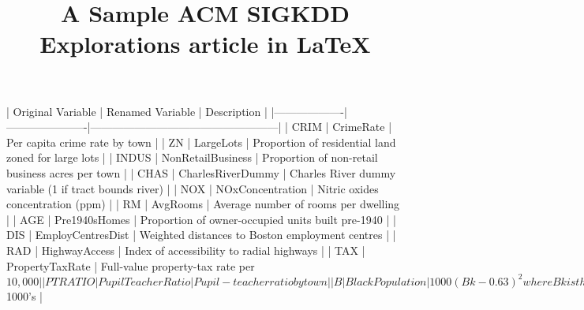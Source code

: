\documentclass{sigkddExp}
\begin{document}
| Original Variable | Renamed Variable     | Description                                       |
|-------------------|----------------------|---------------------------------------------------|
| CRIM              | CrimeRate            | Per capita crime rate by town                     |
| ZN                | LargeLots            | Proportion of residential land zoned for large lots |
| INDUS             | NonRetailBusiness    | Proportion of non-retail business acres per town  |
| CHAS              | CharlesRiverDummy    | Charles River dummy variable (1 if tract bounds river) |
| NOX               | NOxConcentration     | Nitric oxides concentration (ppm)                 |
| RM                | AvgRooms             | Average number of rooms per dwelling              |
| AGE               | Pre1940sHomes        | Proportion of owner-occupied units built pre-1940 |
| DIS               | EmployCentresDist    | Weighted distances to Boston employment centres   |
| RAD               | HighwayAccess        | Index of accessibility to radial highways         |
| TAX               | PropertyTaxRate      | Full-value property-tax rate per $10,000          |
| PTRATIO           | PupilTeacherRatio    | Pupil-teacher ratio by town                       |
| B                 | BlackPopulation      | 1000(Bk - 0.63)^2 where Bk is the proportion of black population |
| LSTAT             | LowerStatusPop       | Percent lower status of the population            |
| MEDV              | MedianHomeValue      | Median value of owner-occupied homes in $1000's   |

%

\title{A Sample ACM SIGKDD Explorations article in LaTeX}
%
\end{document}

